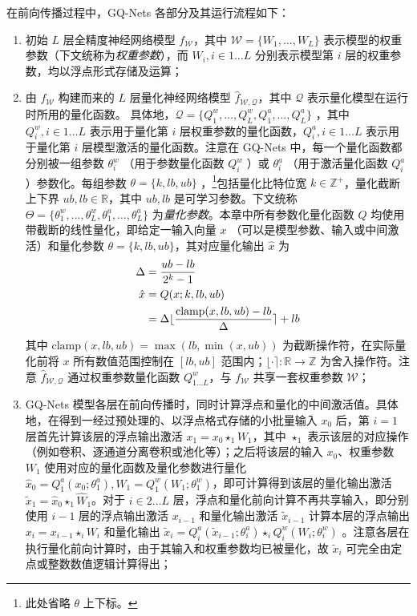 \documentclass[
  fontset = mac,
]{shtthesis}
\begin{document}
在前向传播过程中，GQ-Nets 各部分及其运行流程如下：
\begin{enumerate}[1.]
  \item 初始 $L$ 层全精度神经网络模型 $f_{\mathcal{W}}$，其中 $\mathcal{W} = \{W_1, \ldots, W_L\}$ 表示模型的权重参数（下文统称为\emph{权重参数}），而 $W_i, i \in 1 \ldots L$ 分别表示模型第 $i$ 层的权重参数，均以浮点形式存储及运算；
  \item 由 $f_{\mathcal{W}}$ 构建而来的 $L$ 层量化神经网络模型 $\hat{f}_{\mathcal{W}, \mathcal{Q}}$，其中 $\mathcal{Q}$ 表示量化模型在运行时所用的量化函数。 具体地，$\mathcal{Q} = \{Q^w_1, \ldots , Q^w_L, Q^a_1, \ldots , Q^a_L\}$ ，其中 $Q^w_i, i \in 1\ldots L$ 表示用于量化第 $i$ 层权重参数的量化函数，$Q^a_i, i \in 1\ldots L$ 表示用于量化第 $i$ 层模型激活的量化函数。注意在 GQ-Nets 中，每一个量化函数都分别被一组参数 $\theta^w_i$ （用于参数量化函数 $Q^w_i$ ）或 $\theta^a_i$ （用于激活量化函数 $Q^a_i$ ）参数化。每组参数 $\theta = \{k, lb, ub\}$ ，\footnote{此处省略 $\theta$ 上下标。}包括量化比特位宽 $k \in \mathbb{Z}^+$，量化截断上下界 $ub, lb \in \mathbb{R}$，其中 $ub, lb$ 是可学习参数。下文统称 $\Theta = \{\theta^w_1, \ldots , \theta^w_L, \theta^a_1, \ldots , \theta^a_L\}$ 为\emph{量化参数}。本章中所有参数化量化函数 $Q$ 均使用带截断的线性量化，即给定一输入向量 $x$ （可以是模型参数、输入或中间激活）和量化参数 $\theta = \{k, lb, ub\}$，其对应量化输出 $\hat{x}$ 为
  \begin{align}
    \Delta &= \frac{ub - lb}{2^k - 1} \\
    \hat{x} &= Q(x; k, lb, ub) \notag \\
            &= \Delta \lfloor \frac{\mathrm{clamp}(x, lb, ub) - lb}{\Delta} \rceil + lb \label{eq::gq_nets::linear_q_func}
  \end{align}
  其中 $\mathrm{clamp}(x, lb, ub) = \max(lb, \min(x, ub))$ 为截断操作符，在实际量化前将 $x$ 所有数值范围控制在 $[lb, ub]$ 范围内；$\lfloor\cdot\rceil: \mathbb{R}\to\mathbb{Z}$ 为舍入操作符。注意 $\hat{f}_{\mathcal{W}, \mathcal{Q}}$ 通过权重参数量化函数 $Q^w_{1\ldots L}$，与 $f_{\mathcal{W}}$ 共享一套权重参数 $\mathcal{W}$；
  \item GQ-Nets 模型各层在前向传播时，同时计算浮点和量化的中间激活值。具体地，在得到一经过预处理的、以浮点格式存储的小批量输入 $x_0$ 后，第 $i=1$ 层首先计算该层的浮点输出激活 $x_1 = x_0 \star_1 W_1$，其中 $\star_1$ 表示该层的对应操作（例如卷积、逐通道分离卷积或池化等）；之后将该层的输入 $x_0$、权重参数 $W_1$ 使用对应的量化函数及量化参数进行量化 $\hat{x}_0 = Q^a_1(x_0; \theta^a_1), \hat{W}_1 = Q^w_1(W_1; \theta^w_1)$，即可计算得到该层的量化输出激活 $\tilde{x}_1 = \hat{x}_0 \star_1 \hat{W}_1$。对于 $i\in 2\ldots L$ 层，浮点和量化前向计算不再共享输入，即分别使用 $i-1$ 层的浮点输出激活 $x_{i-1}$ 和量化输出激活 $\tilde{x}_{i-1}$ 计算本层的浮点输出 $x_i = x_{i-1} \star_i W_i$ 和量化输出 $\tilde{x}_i = Q^a_i(\tilde{x}_{i-1}; \theta^a_i) \star_i Q^w_i({W}_{i}; \theta^w_i)$ 。注意各层在执行量化前向计算时，由于其输入和权重参数均已被量化，故 $\tilde{x}_i$ 可完全由定点或整数数值逻辑计算得出；

\end{enumerate}
\end{document}
